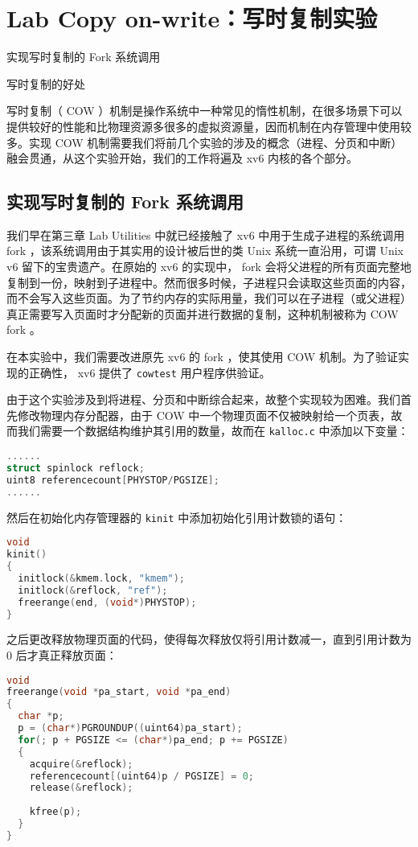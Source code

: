 \chapter{Lab Copy on-write：写时复制实验}
\begin{introduction}
    \item 实现写时复制的 Fork 系统调用
    \item 写时复制的好处
\end{introduction}

写时复制（ COW ）机制是操作系统中一种常见的惰性机制，在很多场景下可以提供较好的性能和比物理资源多很多的虚拟资源量，因而机制在内存管理中使用较多。实现 COW 机制需要我们将前几个实验的涉及的概念（进程、分页和中断）融会贯通，从这个实验开始，我们的工作将遍及 xv6 内核的各个部分。

\section{实现写时复制的 Fork 系统调用}

我们早在第三章 Lab Utilities 中就已经接触了 xv6 中用于生成子进程的系统调用 fork ，该系统调用由于其实用的设计被后世的类 Unix 系统一直沿用，可谓 Unix v6 留下的宝贵遗产。在原始的 xv6 的实现中， fork 会将父进程的所有页面完整地复制到一份，映射到子进程中。然而很多时候，子进程只会读取这些页面的内容，而不会写入这些页面。为了节约内存的实际用量，我们可以在子进程（或父进程）真正需要写入页面时才分配新的页面并进行数据的复制，这种机制被称为 COW fork 。

在本实验中，我们需要改进原先 xv6 的 fork ，使其使用 COW 机制。为了验证实现的正确性， xv6 提供了 \lstinline{cowtest} 用户程序供验证。

由于这个实验涉及到将进程、分页和中断综合起来，故整个实现较为困难。我们首先修改物理内存分配器，由于 COW 中一个物理页面不仅被映射给一个页表，故而我们需要一个数据结构维护其引用的数量，故而在 \lstinline{kalloc.c} 中添加以下变量：
\begin{lstlisting}[language=C]
......
struct spinlock reflock;
uint8 referencecount[PHYSTOP/PGSIZE];
......
\end{lstlisting}

然后在初始化内存管理器的 \lstinline{kinit} 中添加初始化引用计数锁的语句：
\begin{lstlisting}[language=C]
void
kinit()
{
  initlock(&kmem.lock, "kmem");
  initlock(&reflock, "ref");
  freerange(end, (void*)PHYSTOP);
}
\end{lstlisting}

之后更改释放物理页面的代码，使得每次释放仅将引用计数减一，直到引用计数为 0 后才真正释放页面：
\begin{lstlisting}[language=C]
void
freerange(void *pa_start, void *pa_end)
{
  char *p;
  p = (char*)PGROUNDUP((uint64)pa_start);
  for(; p + PGSIZE <= (char*)pa_end; p += PGSIZE)
  {
    acquire(&reflock);
    referencecount[(uint64)p / PGSIZE] = 0;
    release(&reflock);
    
    kfree(p);
  }
}
\end{lstlisting}

